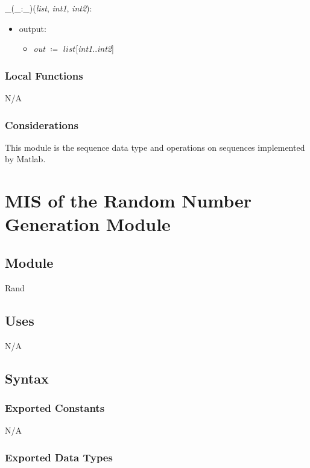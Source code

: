 \documentclass[12pt, titlepage]{article}
\begin{document}
\noindent \_(\_:\_)(\textit{list}, \textit{int1}, \textit{int2}):
\begin{itemize}
	\item output: 
	\begin{itemize}
		\item[] \textit{out} $\coloneqq$ $list$[\textit{int1}..\textit{int2}]
	\end{itemize}
\end{itemize}

\subsubsection{Local Functions}

N/A

\subsubsection{Considerations}
This module is the sequence data type and operations on sequences implemented 
by Matlab.

\newpage
\section{MIS of the Random Number Generation Module} \label{sec:Random}

\subsection{Module}
Rand

\subsection{Uses}

N/A

\subsection{Syntax}

\subsubsection{Exported Constants}
N/A

\subsubsection{Exported Data Types}
\end{document}
